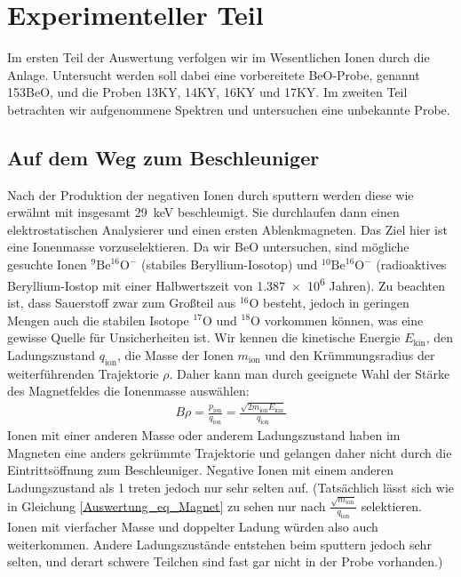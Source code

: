 \section{Experimenteller Teil}
Im ersten Teil der Auswertung verfolgen wir im Wesentlichen Ionen durch die Anlage.
Untersucht werden soll dabei eine vorbereitete BeO-Probe, genannt \glqq 153BeO\grqq{}, und die Proben \glqq 13KY\grqq{}, \glqq 14KY\grqq{}, \glqq 16KY\grqq{} und \glqq 17KY\grqq{}.
Im zweiten Teil betrachten wir aufgenommene Spektren und untersuchen eine unbekannte Probe.

\subsection{Auf dem Weg zum Beschleuniger}
Nach der Produktion der negativen Ionen durch sputtern werden diese wie erwähnt mit insgesamt \SI{29}{\kilo\electronvolt} beschleunigt.
Sie durchlaufen dann einen elektrostatischen Analysierer und einen ersten Ablenkmagneten.
Das Ziel hier ist eine Ionenmasse vorzuselektieren.
Da wir BeO untersuchen, sind mögliche gesuchte Ionen $^{9}\text{Be}^{16}\text{O}^{-}$ (stabiles Beryllium-Iosotop) und $^{10}\text{Be}^{16}\text{O}^{-}$ (radioaktives Beryllium-Iostop mit einer Halbwertszeit von \num{1.387e6} Jahren).
Zu beachten ist, dass Sauerstoff zwar zum Großteil aus $^{16}$O besteht, jedoch in geringen Mengen auch die stabilen Isotope $^{17}$O und $^{18}$O vorkommen können, was eine gewisse Quelle für Unsicherheiten ist.
Wir kennen die kinetische Energie $E_{\text{kin}}$, den Ladungszustand $q_{\text{ion}}$, die Masse der Ionen $m_{\text{ion}}$ und den Krümmungsradius der weiterführenden Trajektorie $\rho$.
Daher kann man durch geeignete Wahl der Stärke des Magnetfeldes die Ionenmasse auswählen:
\begin{gather}
    B \rho = \frac{p_{\text{ion}}}{q_{\text{ion}}} = \frac{\sqrt{2m_{\text{ion}}E_{\text{kin}}}}{q_{\text{ion}}}
    \label{Auswertung_eq_Magnet}
\end{gather}
Ionen mit einer anderen Masse oder anderem Ladungszustand haben im Magneten eine anders gekrümmte Trajektorie und gelangen daher nicht durch die Eintrittsöffnung zum Beschleuniger.
Negative Ionen mit einem anderen Ladungszustand als 1 treten jedoch nur sehr selten auf.
(Tatsächlich lässt sich wie in Gleichung \ref{Auswertung_eq_Magnet} zu sehen nur nach $\frac{\sqrt{m_{\text{ion}}}}{q_{\text{ion}}}$ selektieren.
Ionen mit vierfacher Masse und doppelter Ladung würden also auch weiterkommen. Andere Ladungszustände entstehen beim sputtern jedoch sehr selten, und derart schwere Teilchen sind fast gar nicht in der Probe vorhanden.)
